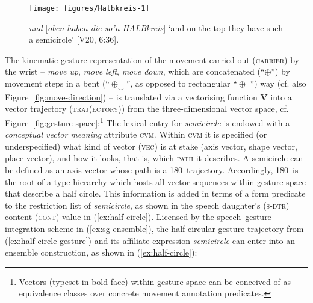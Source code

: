 \documentclass[output=paper
 	        ,biblatex
                ,babelshorthands
                ,newtxmath
                ,draftmode
                ,colorlinks, citecolor=brown
]{langscibook}
\begin{document}
\begin{figure}
  \centering
  \texttt{[image: figures/Halbkreis-1]}
  \caption[]{\textit{und} [\textit{oben haben die so'n HALBkreis}] \enquote*{and on the top they have such a semicircle} [V20, 6:36].}
  \label{fig:halbkreis}
\end{figure}

The kinematic gesture representation of the movement carried out (\textsc{carrier})  by the wrist  -- \textit{move up}, \textit{move left}, \textit{move down}, which are concatenated (``$\oplus$'') by movement steps in a bent (\enquote{\ensuremath{\oplus_\smallsmile}}, as opposed to rectangular \enquote{\ensuremath{\oplus_\llcorner}}) way (cf. also Figure~\ref{fig:move-direction}) -- is translated via a vectorising function \textbf{V} into a vector trajectory (\textsc{traj(ectory)})  from the three-dimensional vector space, cf. Figure~\ref{fig:gesture-space}:\footnote{Vectors (typeset in bold face) within gesture space can be conceived of as equivalence classes over concrete movement annotation predicates.}
%
\ea \label{ex:half-circle-gesture}
\z
%
The lexical entry for \textit{semicircle} is endowed with a \emph{conceptual vector meaning} attribute \textsc{cvm}.
%
Within \textsc{cvm} it is specified (or underspecified) what kind of vector (\textsc{vec})  is at stake (axis vector, shape vector, place vector), and how it looks, that is, which \textsc{path}  it describes.
%
A semicircle can be defined as an axis vector whose path is a 180\textdegree\ trajectory.
%
Accordingly, 180\textdegree\ is the root of a type hierarchy which hosts all vector sequences within gesture space that describe a half circle. 
%
This information is added in terms of a form predicate to the restriction list of \textit{semicircle}, as shown in the speech daughter's (\textsc{s-dtr})  content (\textsc{cont}) value in (\ref{ex:half-circle}).
%
Licensed by the speech--gesture integration scheme in (\ref{ex:sg-ensemble}), the half-circular gesture trajectory from (\ref{ex:half-circle-gesture}) and its affiliate expression \textit{semicircle} can enter into an ensemble construction, as shown in (\ref{ex:half-circle}):
\end{document}
